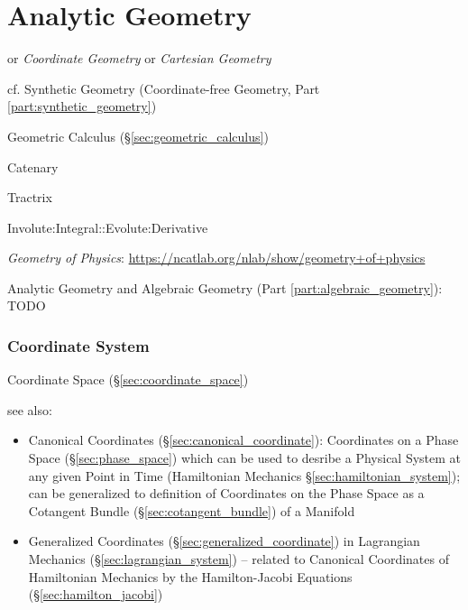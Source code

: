 \part{Analytic Geometry}\label{part:analytic_geometry}

or \emph{Coordinate Geometry} or \emph{Cartesian Geometry}

\fist cf. Synthetic Geometry (Coordinate-free Geometry, Part
\ref{part:synthetic_geometry})

\fist Geometric Calculus (\S\ref{sec:geometric_calculus})

Catenary

Tractrix

Involute:Integral::Evolute:Derivative

\fist \emph{Geometry of Physics}:
\url{https://ncatlab.org/nlab/show/geometry+of+physics}

\asterism

Analytic Geometry and Algebraic Geometry (Part \ref{part:algebraic_geometry}):
TODO



\section{Coordinate System}\label{sec:coordinate_system}

Coordinate Space (\S\ref{sec:coordinate_space})

see also:
\begin{itemize}
  \item Canonical Coordinates (\S\ref{sec:canonical_coordinate}): Coordinates on
    a Phase Space (\S\ref{sec:phase_space}) which can be used to desribe a
    Physical System at any given Point in Time (Hamiltonian Mechanics
    \S\ref{sec:hamiltonian_system}); can be generalized to definition of
    Coordinates on the Phase Space as a Cotangent Bundle
    (\S\ref{sec:cotangent_bundle}) of a Manifold
  \item Generalized Coordinates (\S\ref{sec:generalized_coordinate}) in
    Lagrangian Mechanics (\S\ref{sec:lagrangian_system}) -- related to Canonical
    Coordinates of Hamiltonian Mechanics by the Hamilton-Jacobi Equations
    (\S\ref{sec:hamilton_jacobi})
\end{itemize}

